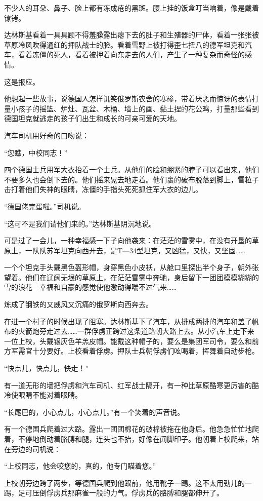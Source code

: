 不少人的耳朵、鼻子、脸上都有冻成疮的黑斑。腰上挂的饭盒叮当响着，像是戴着镣铐。

达林斯基看着一具具顾不得羞臊露出瘪下去的肚子和生殖器的尸体，看着一张张被草原冷风吹得通红的押队战士的脸。看着雪野上被打得歪七扭八的德军坦克和汽车，看着冻僵的死人，看着被押着向东走去的人们，产生了一种复杂而奇怪的感情。

这是报应。

他想起一些故事，说德国人怎样讥笑俄罗斯农舍的寒碜，带着厌恶而惊讶的表情打量小孩子的摇篮、炉灶、瓦盆、木桶、墙上的画、黏土捏的花公鸡，打量那些看到德国坦克就逃走的孩子们出生和成长的可亲可爱的天地。

汽车司机用好奇的口吻说：

“您瞧，中校同志！”

四个德国士兵用军大衣抬着一个士兵。从他们的脸和绷紧的脖子可以看出来，他们不要多久也会倒下去的。他们摇来晃去地走着。他们裹的破布脱落到脚上，雪粒子击打着他们失神的眼睛，冻僵的手指头死死抓住军大衣的边儿。

“德国佬完蛋啦。”司机说。

“这可不是我们请他们来的。”达林斯基阴沉地说。

可是过了一会儿，一种幸福感一下子向他袭来：在茫茫的雪雾中，在没有开垦的草原上，一队队苏军坦克向西开去，是T—34型坦克，又凶猛，又快，又坚固……

一个个坦克手头戴黑色盔形帽，身穿黑色小皮袄，从舱口里探出半个身子，朝外张望着。他们在辽阔无垠的草原上，在茫茫雪雾中奔驰，身后留下一团团模模糊糊的雪的浪花—幸福和自豪的感觉使他激动得喘不过气来……

炼成了钢铁的又威风又沉痛的俄罗斯向西奔去。

在进一个村子的时候出现了阻塞。达林斯基下了汽车，从排成两排的汽车和盖了帆布的火箭炮旁走过去……一群俘虏正跨过这条道路朝大路上去。从小汽车上走下来一位上校，头戴银灰色羊羔皮帽。能戴这种帽子的，要么是集团军司令，要么和前方军需官十分要好。上校看着俘虏。押队士兵朝俘虏们吆喝着，挥舞着自动步枪。

“快点儿，快点儿，快走！”

有一道无形的墙把俘虏和汽车司机、红军战士隔开，有一种比草原酷寒更厉害的酷冷使眼睛不能对着眼睛。

“长尾巴的，小心点儿，小心点儿。”有一个笑着的声音说。

有一个德国兵爬着过大路。露出一团团棉花的破棉被拖在他身后。他急急忙忙地爬着，不停地倒动着胳膊和腿，连头也不抬，好像在闻脚印子。他朝着上校爬来，站在旁边的司机说：

“上校同志，他会咬您的，真的，他专门瞄着您。”

上校朝旁边跨了两步，等德国兵爬到他跟前，他用靴子一踢。这不太用劲儿的一踢，足可压倒俘虏兵那麻雀一般的力气。俘虏兵的胳膊和腿都伸开了。

